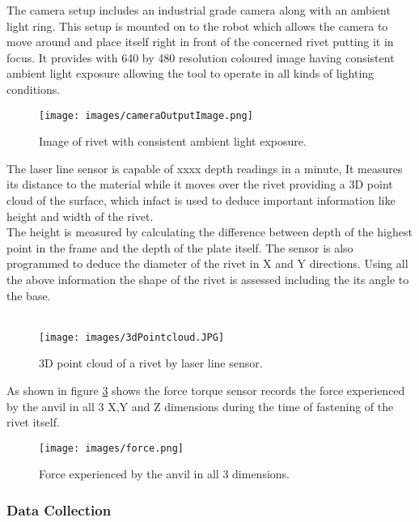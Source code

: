 \documentclass{article}
\begin{document}
The camera setup includes an industrial grade camera along with an ambient light ring. This setup is mounted on to the robot which allows the camera to move around and place itself right in front of the concerned rivet putting it in focus. 
It provides with 640 by 480 resolution coloured image having consistent ambient light exposure allowing the tool to operate in all kinds of lighting conditions.\\

\begin{figure}[H]
        \centering
        \texttt{[image: images/cameraOutputImage.png]}
        \caption{Image of rivet with consistent ambient light exposure. }
         \label{fig:cameraOutputImage}
        \end{figure}


The laser line sensor is capable of xxxx depth readings in a minute, It measures its distance to the material while it moves over the rivet providing a 3D point cloud of the surface, which infact is used to deduce important information like height and width of the rivet.\\
The height is measured by calculating the difference between depth of the highest point in the frame and the depth of the plate itself. The sensor is also programmed to deduce the diameter of the rivet in X and Y directions. Using all the above information the shape of the rivet is assessed including the its angle to the base.\\\\


\begin{figure}[H]
        \centering
        \texttt{[image: images/3dPointcloud.JPG]}
        \caption{3D point cloud of a rivet by laser line sensor. }
         \label{fig:}
        \end{figure}


As shown in figure \ref{fig:forceExperienced} shows the force torque sensor records the force experienced by the anvil in all 3 X,Y and Z dimensions during the time of fastening of the rivet itself.

\begin{figure}[H]
        \centering
        \texttt{[image: images/force.png]}
        \caption{Force experienced by the anvil in all 3 dimensions.}
         \label{fig:forceExperienced}
        \end{figure}

\subsubsection{Data Collection}
\end{document}
